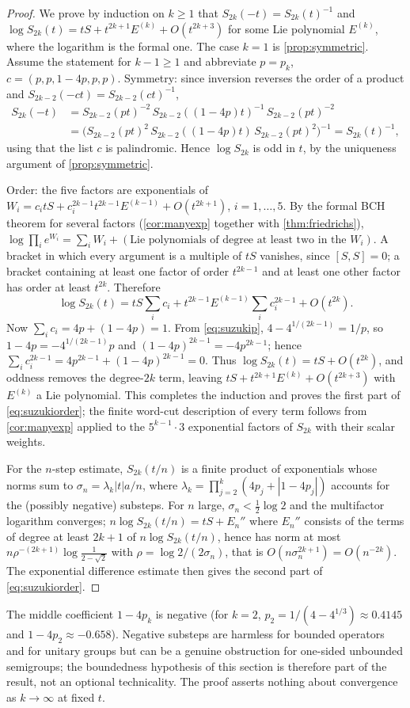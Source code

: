 \begin{proof}
We prove by induction on $k\geq1$ that $S_{2k}(-t)=S_{2k}(t)^{-1}$ and
$\log S_{2k}(t)=tS+t^{2k+1}E^{(k)}+O(t^{2k+3})$ for some Lie polynomial
$E^{(k)}$, where the logarithm is the formal one. The case $k=1$ is
\cref{prop:symmetric}. Assume the statement for $k-1\geq1$ and abbreviate
$p=p_k$, $c=(p,p,1-4p,p,p)$. Symmetry: since inversion reverses the order
of a product and $S_{2k-2}(-ct)=S_{2k-2}(ct)^{-1}$,
\begin{align*}
 S_{2k}(-t)&=S_{2k-2}(pt)^{-2}\,S_{2k-2}((1-4p)t)^{-1}\,S_{2k-2}(pt)^{-2}\\
 &=\bigl(S_{2k-2}(pt)^2\,S_{2k-2}((1-4p)t)\,S_{2k-2}(pt)^2\bigr)^{-1}=S_{2k}(t)^{-1},
\end{align*}
using that the list $c$ is palindromic. Hence $\log S_{2k}$ is odd in $t$,
by the uniqueness argument of \cref{prop:symmetric}.

Order: the five factors are exponentials of
$W_i=c_itS+c_i^{2k-1}t^{2k-1}E^{(k-1)}+O(t^{2k+1})$, $i=1,\ldots,5$. By
the formal BCH theorem for several factors (\cref{cor:manyexp} together
with \cref{thm:friedrichs}), $\log\prod_ie^{W_i}=\sum_iW_i+(\text{Lie
polynomials of degree at least two in the }W_i)$. A bracket in which every
argument is a multiple of $tS$ vanishes, since $[S,S]=0$; a bracket
containing at least one factor of order $t^{2k-1}$ and at least one other
factor has order at least $t^{2k}$. Therefore
\[
 \log S_{2k}(t)=tS\sum_ic_i+t^{2k-1}E^{(k-1)}\sum_ic_i^{2k-1}+O(t^{2k}).
\]
Now $\sum_ic_i=4p+(1-4p)=1$. From \eqref{eq:suzukip},
$4-4^{1/(2k-1)}=1/p$, so $1-4p=-4^{1/(2k-1)}p$ and
$(1-4p)^{2k-1}=-4p^{2k-1}$; hence $\sum_ic_i^{2k-1}=4p^{2k-1}+(1-4p)^{2k-1}=0$.
Thus $\log S_{2k}(t)=tS+O(t^{2k})$, and oddness removes the degree-$2k$
term, leaving $tS+t^{2k+1}E^{(k)}+O(t^{2k+3})$ with $E^{(k)}$ a Lie
polynomial. This completes the induction and proves the first part of
\eqref{eq:suzukiorder}; the finite word-cut description of every term
follows from \cref{cor:manyexp} applied to the $5^{k-1}\cdot3$ exponential
factors of $S_{2k}$ with their scalar weights.

For the $n$-step estimate, $S_{2k}(t/n)$ is a finite product of
exponentials whose norms sum to $\sigma_n=\lambda_k|t|a/n$, where
$\lambda_k=\prod_{j=2}^k(4p_j+|1-4p_j|)$ accounts for the (possibly
negative) substeps. For $n$ large, $\sigma_n<\tfrac12\log2$ and the
multifactor logarithm converges; $n\log S_{2k}(t/n)=tS+E_n''$ where
$E_n''$ consists of the terms of degree at least $2k+1$ of
$n\log S_{2k}(t/n)$, hence has norm at most
$n\rho^{-(2k+1)}\log\frac1{2-\sqrt2}$ with $\rho=\log2/(2\sigma_n)$, that
is $O(n\sigma_n^{2k+1})=O(n^{-2k})$. The exponential difference estimate
then gives the second part of \eqref{eq:suzukiorder}.
\end{proof}
The middle coefficient $1-4p_k$ is negative (for $k=2$,
$p_2=1/(4-4^{1/3})\approx0.4145$ and $1-4p_2\approx-0.658$). Negative
substeps are harmless for bounded operators and for unitary groups but can
be a genuine obstruction for one-sided unbounded semigroups; the
boundedness hypothesis of this section is therefore part of the result, not
an optional technicality. The proof asserts nothing about convergence as
$k\to\infty$ at fixed $t$.
